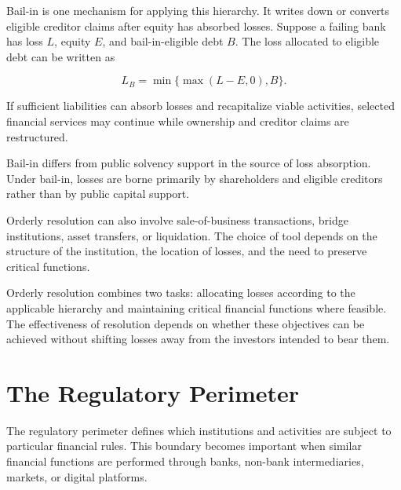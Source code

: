 Bail-in is one mechanism for applying this hierarchy. It writes down or converts eligible creditor claims after equity has absorbed losses. Suppose a failing bank has loss \(L\), equity \(E\), and bail-in-eligible debt \(B\). The loss allocated to eligible debt can be written as

\begin{equation}
L_B
=\min\{\max(L-E,0),B\}.
\label{eq:ch23-bail-in-loss}
\end{equation}

If sufficient liabilities can absorb losses and recapitalize viable activities, selected financial services may continue while ownership and creditor claims are restructured.

Bail-in differs from public solvency support in the source of loss absorption. Under bail-in, losses are borne primarily by shareholders and eligible creditors rather than by public capital support.

Orderly resolution can also involve sale-of-business transactions, bridge institutions, asset transfers, or liquidation. The choice of tool depends on the structure of the institution, the location of losses, and the need to preserve critical functions.

\begin{tcolorbox}[
  enhanced,
  breakable,
  colback=white,
  colframe=FinanceBlue,
  boxrule=0.7pt,
  sharp corners,
  borderline west={2.2pt}{0pt}{FinanceBlue},
  title=\textbf{Financial Perspective: Loss Allocation and Continuity},
  coltitle=white,
  colbacktitle=FinanceBlue,
  fonttitle=\bfseries,
  before skip=1.2em,
  after skip=1.2em
]

Orderly resolution combines two tasks: allocating losses according to the applicable hierarchy and maintaining critical financial functions where feasible. The effectiveness of resolution depends on whether these objectives can be achieved without shifting losses away from the investors intended to bear them.

\end{tcolorbox}

\section{The Regulatory Perimeter}

The regulatory perimeter defines which institutions and activities are subject to particular financial rules. This boundary becomes important when similar financial functions are performed through banks, non-bank intermediaries, markets, or digital platforms.

